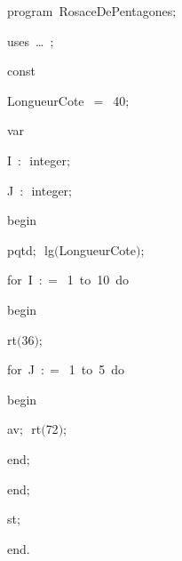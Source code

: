 
{
\parindent {}
\medskip

\carrenoir
\vspace{\neglskip}\mbox{\blc  \idt  \mcl program\idt \ RosaceDePentagones$;$
}\par 
\vspace{\neglskip}\mbox{\blc \blk\idt \mcl uses\idt \ \ldots\ $;$
}\par 
\pagebreak[3] 
\vspace{\neglskip}\mbox{\blc  \blk\idt  \mcl const\idt \ }\par 
\vspace{\neglskip}\mbox{\blc  \blk\blk\idt  LongueurCote\ $=$\ 40$;$}\par 
\pagebreak[3] 
\vspace{\neglskip}\mbox{\blc  \blk\idt  \mcl var\idt }\par 
\vspace{\neglskip}\mbox{\blc  \blk\blk\idt  I\ $:$\ integer$;$}\par 
\vspace{\neglskip}\mbox{\blc  \blk\blk\idt  J\ $:$\ integer$;$}\par 
\vspace{\neglskip}\mbox{\blc  \idt  \mcl begin\idt }\par 
\vspace{\neglskip}\mbox{\blc  \blk\idt  pqtd$;$\ lg$($LongueurCote$)$$;$\ }\par 
\pagebreak[3] 
\vspace{\neglskip}\mbox{\blc  \blk\idt  \mcl for\idt \ I\ $:$$=$\ 1\ \mcl to\idt \ 10\ \mcl do\idt }\par 
\vspace{\neglskip}\mbox{\blc  \blk\blk\idt  \mcl begin\idt }\par 
\vspace{\neglskip}\mbox{\blc  \blk\blk\blk\idt  rt$($36$)$$;$}\par 
\pagebreak[3] 
\vspace{\neglskip}\mbox{\blc  \blk\blk\blk\idt  \mcl for\idt \ J\ $:$$=$\ 1\ \mcl to\idt \ 5\ \mcl do\idt }\par 
\vspace{\neglskip}\mbox{\blc  \blk\blk\blk\blk\idt  \mcl begin\idt }\par 
\vspace{\neglskip}\mbox{\blc  \blk\blk\blk\blk\blk\idt  av$;$\ rt$($72$)$$;$}\par 
\vspace{\neglskip}\mbox{\blc  \blk\blk\blk\blk\idt  \mcl end\idt $;$}\par 
\vspace{\neglskip}\mbox{\blc  \blk\blk\idt  \mcl end\idt $;$}\par 
\vspace{\neglskip}\mbox{\blc  \blk\idt  st$;$}\par 
\vspace{\neglskip}\mbox{\blc  \idt  \mcl end\idt $.$}\par 

\medskip }

